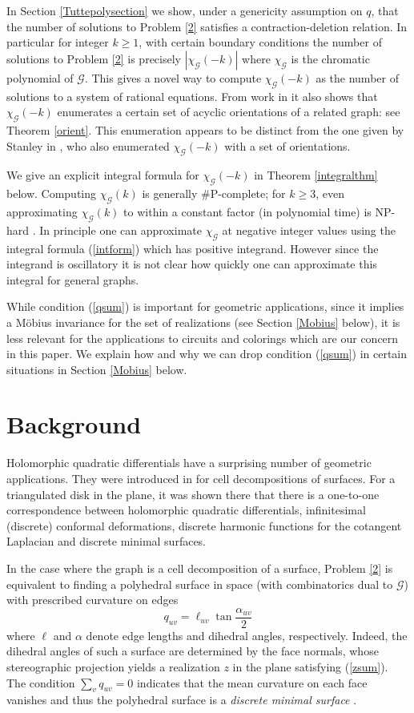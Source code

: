 \documentclass[12pt]{amsart}
\newcommand{\G}{{\mathcal G}}
\begin{document}
In Section \ref{Tuttepolysection} we show, under a genericity assumption on $q$,  that
the number of solutions to Problem \ref{2} satisfies a contraction-deletion relation.
In particular for integer $k\ge 1$,
with certain boundary conditions the number of solutions to Problem \ref{2} is
precisely $|\chi_{\G}(-k)|$ where $\chi_{\G}$ is the chromatic polynomial of $\G$.
This gives a novel way to compute $\chi_{\G}(-k)$ as the number of solutions to a system of rational equations. 
From work in \cite{Abrams2015} it also shows that $\chi_{\G}(-k)$ 
enumerates a certain set
of acyclic orientations of a related graph: see Theorem \ref{orient}. This enumeration appears to be 
distinct from the one given by Stanley in \cite{Stanley2006}, who also enumerated $\chi_{\G}(-k)$ with a set of orientations.

We give an explicit integral formula for $\chi_\G(-k)$ in Theorem \ref{integralthm} below.
Computing $\chi_{\G}(k)$ is generally \#P-complete; for $k\ge 3$, even approximating $\chi_{\G}(k)$ to within a constant factor
(in polynomial time) is NP-hard \cite{Goldberg2008}.
In principle one can approximate $\chi_{\G}$ at negative integer values using the integral formula (\ref{intform}) which has positive integrand. 
However since the integrand is oscillatory
it is not clear how quickly one can approximate this integral for general graphs.

While condition (\ref{qsum}) is important for geometric applications,
since it implies a M\"obius invariance for the set of realizations (see Section \ref{Mobius} below), it is less relevant for the applications
to circuits and colorings which are our concern in this paper. We explain how and why we can drop condition (\ref{qsum}) in certain situations in Section \ref{Mobius} below.

\section{Background}\label{bkgd}

Holomorphic quadratic differentials have a surprising number of geometric applications.
They were introduced in \cite{Lam2015a} for cell decompositions of surfaces. For a triangulated disk in the plane, it was shown there that there is a one-to-one correspondence between holomorphic quadratic differentials, infinitesimal (discrete) conformal deformations, discrete harmonic functions for the cotangent Laplacian and discrete minimal surfaces.  

In the case where the graph is a cell decomposition of a surface, Problem \ref{2} is equivalent to finding a polyhedral surface in space 
(with combinatorics dual to $\G$) with prescribed curvature on edges
\[
q_{uv} = \ell_{uv} \tan \frac{\alpha_{uv}}{2}
\] 
where $\ell$ and $\alpha$ denote edge lengths and dihedral angles, respectively. Indeed, the dihedral angles of such a surface
are determined by the face normals, whose stereographic projection yields a realization $z$ in the plane satisfying (\ref{zsum}). 
The condition $\sum_{v} q_{uv} =0$ indicates that the mean curvature on each face vanishes and thus the polyhedral surface is a 
\emph{discrete minimal surface} \cite{Lam2016}. 
\end{document}
